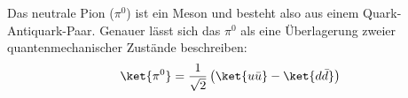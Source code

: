 Das neutrale Pion ($\pi^{0}$) ist ein Meson und besteht also aus einem Quark-Antiquark-Paar. Genauer l\"asst sich das $\pi^{0}$ als eine \"Uberlagerung zweier quantenmechanischer Zust\"ande beschreiben:
\begin{align}
\ket{\pi^{0}} = \frac{1}{\sqrt{2}}\left(\ket{u\bar{u}}-\ket{d\bar{d}}\right) \label{eq:pi0state}
\end{align}